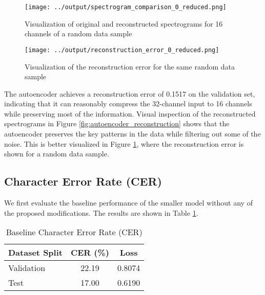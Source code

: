 \begin{figure}[h]
    \centering
    \begin{minipage}{0.48\textwidth}
        \centering
        \texttt{[image: ../output/spectrogram\_comparison\_0\_reduced.png]}
        \caption{Visualization of original and reconstructed spectrograms for 16 channels of a random data sample}
        \label{fig:autoencoder_reconstruction}
    \end{minipage}
    \hfill
    \begin{minipage}{0.48\textwidth}
        \centering
        \texttt{[image: ../output/reconstruction\_error\_0\_reduced.png]}
        \caption{Visualization of the reconstruction error for the same random data sample}
        \label{fig:autoencoder_error}
    \end{minipage}
\end{figure}

The autoencoder achieves a reconstruction error of 0.1517 on the validation set, indicating that it can reasonably compress the 32-channel input to 16 channels while preserving most of the information. Visual inspection of the reconstructed spectrograms in Figure \ref{fig:autoencoder_reconstruction} shows that the autoencoder preserves the key patterns in the data while filtering out some of the noise. This is better visualized in Figure \ref{fig:autoencoder_error}, where the reconstruction error is shown for a random data sample.

\subsection{Character Error Rate (CER)}

We first evaluate the baseline performance of the smaller model without any of the proposed modifications. The results are shown in Table \ref{tab:baseline_cer}.

\begin{table}[h]
    \centering
    \caption{Baseline Character Error Rate (CER)}
    \begin{tabular}{lcc}
        \hline
        \textbf{Dataset Split} & \textbf{CER (\%)} & \textbf{Loss} \\
        \hline
        Validation             & 22.19             & 0.8074        \\
        Test                   & 17.00             & 0.6190        \\
        \hline
    \end{tabular}
    \label{tab:baseline_cer}
\end{table}

